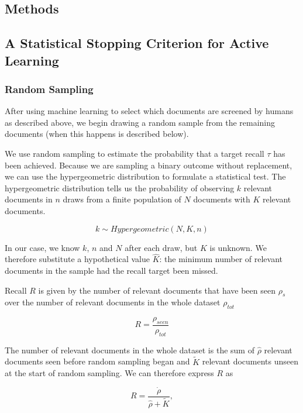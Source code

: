 \documentclass{bmcart}
\begin{document}
\subsection*{Methods}

\subsection*{A Statistical Stopping Criterion for Active Learning}

	\subsubsection*{Random Sampling}
	
	After using machine learning to select which documents are screened by humans as described above, we begin drawing a random sample from the remaining documents (when this happens is described below). 

	We use random sampling to estimate the probability that a target recall $\tau$ has been achieved. Because we are sampling a binary outcome without replacement, we can use the hypergeometric distribution to formulate a statistical test. The hypergeometric distribution tells us the probability of observing $k$ relevant documents in $n$ draws from a finite population of $N$ documents with $K$ relevant documents. 
	
	\begin{equation}
		k \sim Hypergeometric(N, K, n)
	\end{equation}
	
	In our case, we know $k$, $n$ and $N$ after each draw, but $K$ is unknown. We therefore substitute a hypothetical value $\hat{K}$: the minimum number of relevant documents in the sample had the recall target been missed.
	
	Recall $R$ is given by the number of relevant documents that have been seen $\rho_{s}$ over the number of relevant documents in the whole dataset $\rho_{tot}$
	
	\begin{equation}
		R = \frac{\rho_{seen}}{\rho_{tot}}
	\end{equation}
	
	The number of relevant documents in the whole dataset is the sum of $\hat{\rho}$ relevant documents seen before random sampling began and $\tilde{K}$ relevant documents unseen at the start of random sampling. We can therefore express $R$ as
	
	\begin{equation}
		R = \frac{\dot{\rho}}{\hat{\rho} + \tilde{K}},
	\end{equation}
	
\end{document}
